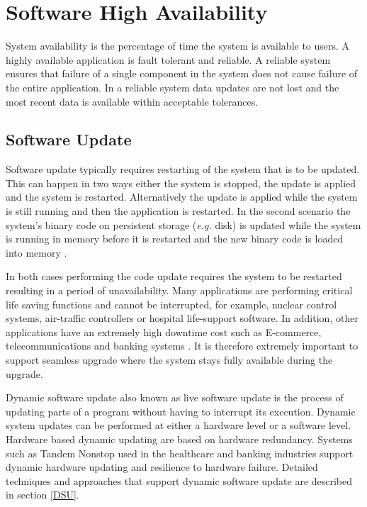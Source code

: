 \documentclass[a4paper,11pt,twoside]{report}
\begin{document}
\section{Software High Availability }\label{subsec:rules}
System availability is the percentage of time the system is available to users. A highly available application is fault tolerant and reliable. A reliable system ensures that failure of a single component in the system does not cause failure of the entire application. In a reliable system data updates are not lost and the most recent data is available within acceptable tolerances. 


\subsection*{Software Update} 
Software update typically requires restarting of the system that is to be updated. This can happen in two ways either the system is stopped, the update is applied and the system is restarted. Alternatively the update is applied while the system is still running and then the application is restarted. In the second scenario the system's binary code on persistent storage (\textit{e.g.} disk) is updated while the system is running in memory before it is restarted and the new binary code is loaded into memory \cite{Java}. 

In both cases performing the code update requires the system to be restarted resulting in a period of unavailability. Many applications are performing critical life saving functions and cannot be interrupted, for example, nuclear control systems, air-traffic controllers or hospital life-support software. In addition, other applications have an extremely high downtime cost such as E-commerce, telecommunications and banking systems \cite{fly}. It is therefore extremely important to support seamless upgrade where the system stays fully available during the upgrade. 

Dynamic software update also known as live software update is the process of updating parts of a program without having to interrupt its execution. Dynamic system updates can be performed at either a hardware level or a software level. Hardware based dynamic updating are based on hardware redundancy. Systems such as Tandem Nonstop \cite{Tandem} used in the healthcare and banking industries support dynamic hardware updating and resilience to hardware failure. Detailed techniques and approaches that support dynamic software update are described in section \ref{DSU}. 
\end{document}
